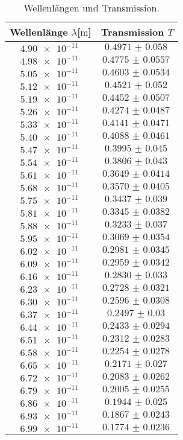 \begin{table}
\centering
\caption{Wellenlängen und Transmission.}
\label{tab:VIVONZULUL}
\begin{tabular}{c c}
    \toprule
    Wellenlänge $\lambda$[$\si{\meter}$] & Transmission $T$\\
    \midrule
    $\SI{4.90e-11}{}$  & $\SI{0.4971(580)}{}$ \\
    $\SI{4.98e-11}{}$  & $\SI{0.4775(557)}{}$ \\
    $\SI{5.05e-11}{}$  & $\SI{0.4603(534)}{}$ \\ 
    $\SI{5.12e-11}{}$  & $\SI{0.4521(520)}{}$ \\ 
    $\SI{5.19e-11}{}$  & $\SI{0.4452(507)}{}$ \\ 
    $\SI{5.26e-11}{}$  & $\SI{0.4274(487)}{}$ \\ 
    $\SI{5.33e-11}{}$  & $\SI{0.4141(471)}{}$ \\ 
    $\SI{5.40e-11}{}$  & $\SI{0.4088(461)}{}$ \\     
    $\SI{5.47e-11}{}$  & $\SI{0.3995(450)}{}$ \\   
    $\SI{5.54e-11}{}$  & $\SI{0.3806(430)}{}$ \\   
    $\SI{5.61e-11}{}$  & $\SI{0.3649(414)}{}$ \\   
    $\SI{5.68e-11}{}$  & $\SI{0.3570(405)}{}$ \\   
    $\SI{5.75e-11}{}$  & $\SI{0.3437(390)}{}$ \\   
    $\SI{5.81e-11}{}$  & $\SI{0.3345(382)}{}$ \\   
    $\SI{5.88e-11}{}$  & $\SI{0.3233(370)}{}$ \\   
    $\SI{5.95e-11}{}$  & $\SI{0.3069(354)}{}$ \\   
    $\SI{6.02e-11}{}$  & $\SI{0.2981(345)}{}$ \\ 
    $\SI{6.09e-11}{}$  & $\SI{0.2959(342)}{}$ \\   
    $\SI{6.16e-11}{}$  & $\SI{0.2830(330)}{}$ \\ 
    $\SI{6.23e-11}{}$  & $\SI{0.2728(321)}{}$ \\
    $\SI{6.30e-11}{}$  & $\SI{0.2596(308)}{}$ \\ 
    $\SI{6.37e-11}{}$  & $\SI{0.2497(300)}{}$ \\ 
    $\SI{6.44e-11}{}$  & $\SI{0.2433(294)}{}$ \\ 
    $\SI{6.51e-11}{}$  & $\SI{0.2312(283)}{}$ \\ 
    $\SI{6.58e-11}{}$  & $\SI{0.2254(278)}{}$ \\ 
    $\SI{6.65e-11}{}$  & $\SI{0.2171(270)}{}$ \\ 
    $\SI{6.72e-11}{}$  & $\SI{0.2083(262)}{}$ \\ 
    $\SI{6.79e-11}{}$  & $\SI{0.2005(255)}{}$ \\ 
    $\SI{6.86e-11}{}$  & $\SI{0.1944(250)}{}$ \\ 
    $\SI{6.93e-11}{}$  & $\SI{0.1867(243)}{}$ \\ 
    $\SI{6.99e-11}{}$  & $\SI{0.1774(236)}{}$ \\   
    \bottomrule
\end{tabular}
\end{table}

